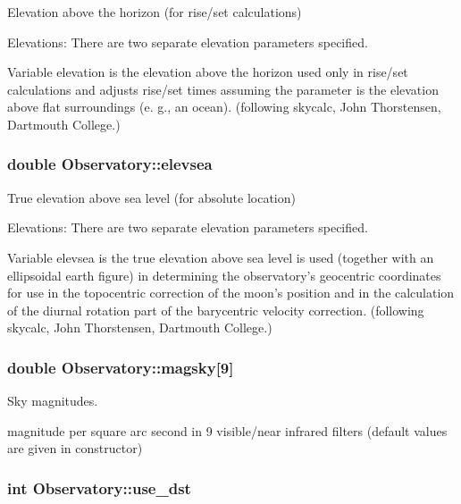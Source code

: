 Elevation above the horizon (for rise/set calculations) 

Elevations\-: There are two separate elevation parameters specified. \par
 Variable elevation is the elevation above the horizon used only in rise/set calculations and adjusts rise/set times assuming the parameter is the elevation above flat surroundings (e. g., an ocean). (following skycalc, John Thorstensen, Dartmouth College.) \hypertarget{class_observatory_afb7b978a4a804e1f1b7b18355d2bd2be}{
\subsubsection[{elevsea}]{\setlength{\rightskip}{0pt plus 5cm}double Observatory\-::elevsea}}\label{class_observatory_afb7b978a4a804e1f1b7b18355d2bd2be}


True elevation above sea level (for absolute location) 

Elevations\-: There are two separate elevation parameters specified. \par
 Variable elevsea is the true elevation above sea level is used (together with an ellipsoidal earth figure) in determining the observatory's geocentric coordinates for use in the topocentric correction of the moon's position and in the calculation of the diurnal rotation part of the barycentric velocity correction. (following skycalc, John Thorstensen, Dartmouth College.) \hypertarget{class_observatory_a6e5da8fe4abb0590322d435eeb557758}{
\subsubsection[{magsky}]{\setlength{\rightskip}{0pt plus 5cm}double Observatory\-::magsky\mbox{[}9\mbox{]}}}\label{class_observatory_a6e5da8fe4abb0590322d435eeb557758}


Sky magnitudes. 

magnitude per square arc second in 9 visible/near infrared filters (default values are given in constructor) \hypertarget{class_observatory_a98979301df0236da8fa1fbb857ef6ee6}{
\subsubsection[{use\-\_\-dst}]{\setlength{\rightskip}{0pt plus 5cm}int Observatory\-::use\-\_\-dst}}\label{class_observatory_a98979301df0236da8fa1fbb857ef6ee6}


